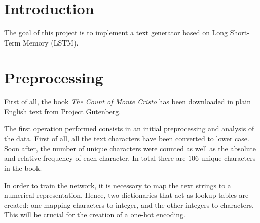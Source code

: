 \documentclass[a4paper,12pt]{article} %
\begin{document}
	

	\thispagestyle{empty}  
	\vspace{0.4cm}

	
	\section{Introduction}
	The goal of this project is to implement a text generator based on Long 
	Short-Term Memory (LSTM).
	
	
	
	\section{Preprocessing}
	First of all, the book \textit{The Count of Monte Cristo} has been  
	downloaded in plain English text from Project Gutenberg.
	
	The first operation performed consists in an initial preprocessing and 
	analysis of the data.
	First of all, all the text characters have been converted to lower case. 
	Soon after, the number of unique characters were counted as well as the 
	absolute and relative frequency of each character. In total there are $106$ 
	unique characters in the book.
	
	In order to train the network, it is necessary to map the text strings to a 
	numerical representation. Hence, two dictionaries that act as lookup tables 
	are created: one mapping characters to integer, and the other integers to 
	characters. This will be crucial for the creation of a one-hot encoding.
	
\end{document}
